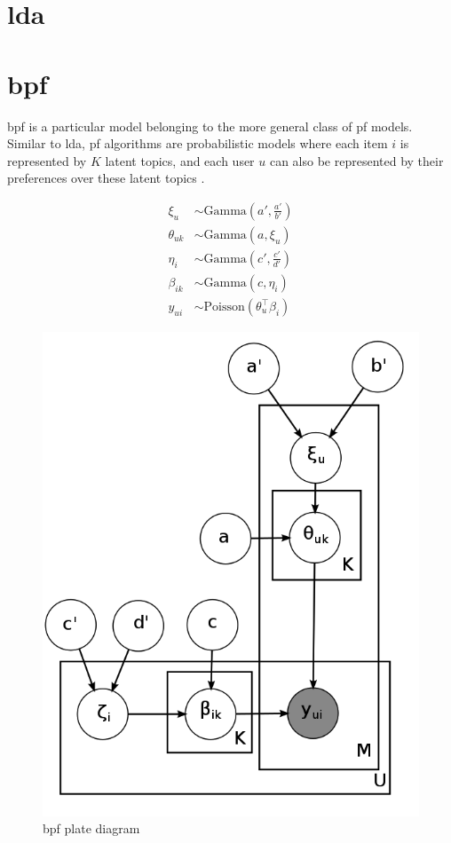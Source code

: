 \documentclass{article} %
\begin{document}
\section{\acrlong{lda}}

\section{\acrlong{bpf}}
\acrlong{bpf} is a particular model belonging to the more general class of \gls{pf} models. Similar to \gls{lda}, \gls{pf} algorithms are probabilistic models where each item $i$ is represented by $K$ latent topics, and each user $u$ can also be represented by their preferences over these latent topics \citep{gopalan2013scalable}.

\begin{align*}
	\xi_u &\sim \mathrm{Gamma}\left( a', \frac{a'}{b'} \right) \\
	\theta_{uk} &\sim \mathrm{Gamma}\left( a, \xi_u \right) \\
	\eta_i &\sim \mathrm{Gamma}\left( c', \frac{c'}{d'} \right) \\
	\beta_{ik} &\sim \mathrm{Gamma}\left( c, \eta_i \right) \\
	y_{ui} &\sim \mathrm{Poisson}\left( \theta^\top_u \beta_i \right )
\end{align*}

\begin{figure}[h]
\begin{center}
	\includegraphics[scale=0.25]{bpf.png}
\end{center}
\caption{\acrlong{bpf} plate diagram}
\label{fig:bpf-model}
\end{figure}
\end{document}
